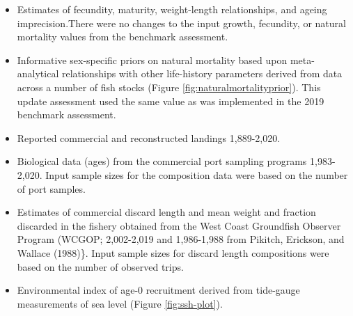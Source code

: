 \documentclass[11pt,
  english,
  a4paper,
]{article}
\begin{document}

\begin{itemize}
\item

  Estimates of fecundity, maturity, weight-length relationships, and ageing imprecision.There were no changes to the input growth, fecundity, or natural mortality values from the benchmark assessment.

  \leavevmode\tagmcend\tagstructend\par
\item

  Informative sex-specific priors on natural mortality based upon meta-analytical relationships with other life-history parameters derived from data across a number of fish stocks (Figure \ref{fig:naturalmortalityprior}). This update assessment used the same value as was implemented in the 2019 benchmark assessment.

  \leavevmode\tagmcend\tagstructend\par
\item

  Reported commercial and reconstructed landings 1,889-2,020.

  \leavevmode\tagmcend\tagstructend\par
\item

  Biological data (ages) from the commercial port sampling programs 1,983-2,020. Input sample sizes for the composition data were based on the number of port samples.

  \leavevmode\tagmcend\tagstructend\par
\item

  Estimates of commercial discard length and mean weight and fraction discarded in the fishery obtained from the West Coast Groundfish Observer Program (WCGOP; 2,002-2,019 and 1,986-1,988 from {Pikitch, Erickson, and Wallace (1988)\leavevmode\tagmcend\tagstructend}\}. Input sample sizes for discard length compositions were based on the number of observed trips.

  \leavevmode\tagmcend\tagstructend\par
\item

  Environmental index of age-0 recruitment derived from tide-gauge measurements of sea level (Figure \ref{fig:ssh-plot}).

  \leavevmode\tagmcend\tagstructend\par
\end{itemize}
\end{document}
